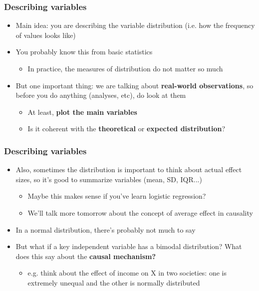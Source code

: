 \documentclass[aspectratio=43]{beamer}
\begin{document}
\begin{frame}
\frametitle{Describing variables}
\centering

\begin{itemize}
  \item Main idea: you are describing the variable distribution (i.e. how the frequency of values looks like)
  \item You probably know this from basic statistics
  \begin{itemize}
    \item In practice, the measures of distribution do not matter so much
  \end{itemize}
  \item But one important thing: we are talking about \textbf{real-world observations}, so before you do anything (analyses, etc), do look at them
  \begin{itemize}
    \item At least, \textbf{plot the main variables}
    \item Is it coherent with the \textbf{theoretical} or \textbf{expected distribution}?
  \end{itemize}
\end{itemize}

\end{frame}

\begin{frame}
\frametitle{Describing variables}
\centering

\begin{itemize}
  \item Also, sometimes the distribution is important to think about actual effect sizes, so it's good to summarize variables {\footnotesize (mean, SD, IQR...)}
  \begin{itemize}
    \item Maybe this makes sense if you've learn logistic regression?
    \item We'll talk more tomorrow about the concept of average effect in causality
  \end{itemize}
  \item In a normal distribution, there's probably not much to say
  \item But what if a key independent variable has a bimodal distribution? What does this say about the \textbf{causal mechanism?}
  \begin{itemize}
    \item e.g. think about the effect of income on X in two societies: one is extremely unequal and the other is normally distributed
  \end{itemize}
\end{itemize}

\end{frame}
\end{document}
